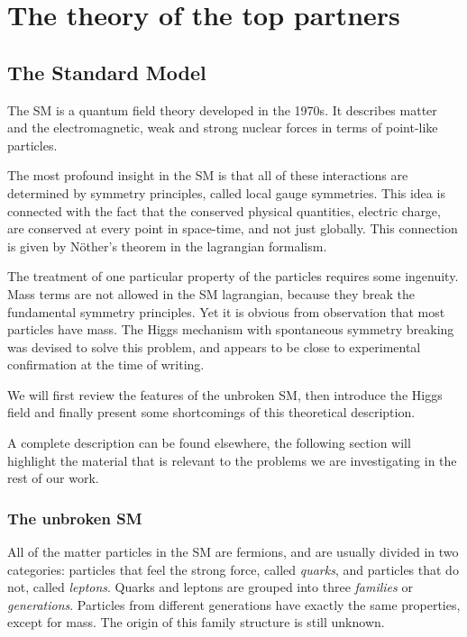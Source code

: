 \chapter{The theory of the top partners}\label{ch:top_partner}
\section{The Standard Model}

The SM is a quantum field theory developed in the 1970s. It
describes matter and the electromagnetic, weak and strong nuclear forces in terms of point-like particles. 

The most profound insight in the SM is that all of these interactions are
determined by symmetry principles, called local gauge symmetries.
This idea is connected with the fact that the conserved physical quantities,
\eg electric charge, are conserved at every point in space-time, and not
just globally. This connection is given by N\"other's theorem in the
lagrangian formalism.

The treatment of one particular property of the particles requires some
ingenuity. Mass terms are not allowed in the SM lagrangian, because they
break the fundamental symmetry principles. Yet it is obvious from
observation that most particles have mass. The Higgs mechanism with
spontaneous symmetry breaking was devised to solve this problem, and appears
to be close to experimental confirmation at the time of writing.

We will first review the features of the unbroken SM, then introduce the
Higgs field and finally present some shortcomings of this theoretical
description.

A complete description can be found elsewhere, the following
section will highlight the material that is relevant to the problems we are
investigating in the rest of our work.

\subsection{The unbroken SM}
All of the matter particles in the SM are fermions, and are usually divided
in two categories: particles that feel the strong force, called
\emph{quarks}, and particles that do not, called \emph{leptons}. Quarks and
leptons are grouped into three \emph{families} or \emph{generations}. Particles from different
generations have exactly the same properties, except for mass. The origin of
this family structure is still unknown.


